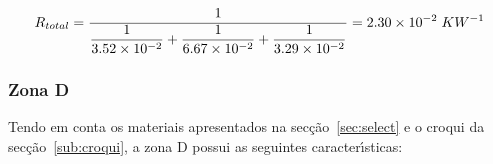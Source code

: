 \documentclass[12pt, a4paper]{article}
\begin{document}
\begin{equation}
	R_{total} =
	\dfrac{1}{
		\dfrac{1}{
			3.52 \times 10^{-2} 
		} +
		\dfrac{1}{
			6.67 \times 10^{-2}
		} +
		\dfrac{1}{
			3.29 \times 10^{-2} 
		}
	}
	= 2.30 \times 10^{-2} \hspace{1mm} KW^{-1}
	\label{eq:zona_c_total}
\end{equation}


\subsubsection{Zona D}\label{ssub:Zona D}

Tendo em conta os materiais apresentados na sec\c{c}\~ao~\ref{sec:select} e o croqui da
sec\c{c}\~ao~\ref{sub:croqui}, a zona D possui as seguintes caracter\'{\i}sticas:
\newpage
\end{document}

